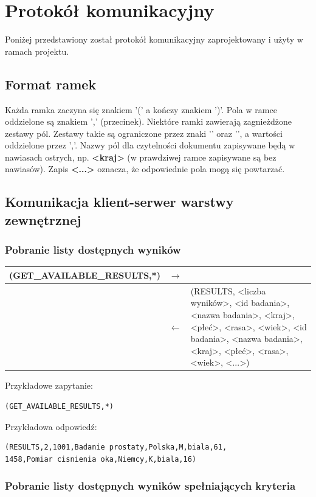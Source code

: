 \section{Protokół komunikacyjny}
Poniżej przedstawiony został protokół komunikacyjny zaprojektowany i użyty w ramach projektu.

\subsection{Format ramek}
Każda ramka zaczyna się znakiem '(' a kończy znakiem ')'. Pola w ramce oddzielone są znakiem ',' (przecinek). Niektóre ramki zawierają zagnieżdżone zestawy pól. Zestawy takie są ograniczone przez znaki '{' oraz '}', a wartości oddzielone przez ','. Nazwy pól dla czytelności dokumentu zapisywane będą w nawiasach ostrych, np. \textbf{<kraj>} (w prawdziwej ramce zapisywane są bez nawiasów). Zapis \textbf{<...>} oznacza, że odpowiednie pola mogą się powtarzać.

\subsection{Komunikacja klient-serwer warstwy zewnętrznej}

\subsubsection{Pobranie listy dostępnych wyników}

\begin{longtable}{| p{} | p{}| p{} |} 
\hline
(GET\_AVAILABLE\_RESULTS,*) & $\rightarrow$ &  \\ \hline
 & $\leftarrow$ & (RESULTS, <liczba wyników>, <id badania>, <nazwa badania>, <kraj>, <płeć>, <rasa>, <wiek>, <id badania>, <nazwa badania>, <kraj>, <płeć>, <rasa>, <wiek>, <...>) \\ \hline
\end{longtable}

Przykładowe zapytanie:
\begin{lstlisting}[style=incode]
(GET_AVAILABLE_RESULTS,*)
\end{lstlisting}
Przykładowa odpowiedź:
\begin{lstlisting}[style=incode]
(RESULTS,2,1001,Badanie prostaty,Polska,M,biala,61,
1458,Pomiar cisnienia oka,Niemcy,K,biala,16)
\end{lstlisting}

\subsubsection{Pobranie listy dostępnych wyników spełniających kryteria}


